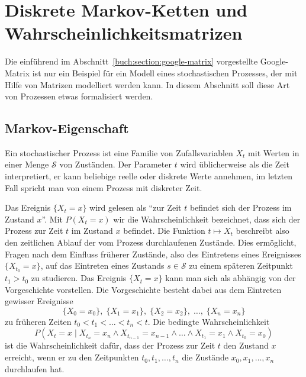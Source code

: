 %
%
%
\section{Diskrete Markov-Ketten und Wahrscheinlichkeitsmatrizen
\label{buch:section:diskrete-markov-ketten}}
Die einführend im Abschnitt~\ref{buch:section:google-matrix}
vorgestellte Google-Matrix ist nur ein Beispiel für ein
Modell eines stochastischen Prozesses, der mit Hilfe von Matrizen
modelliert werden kann.
In diesem Abschnitt soll diese Art von Prozessen etwas formalisiert
werden.

%
% 
\subsection{Markov-Eigenschaft}
Ein stochastischer Prozess ist eine Familie von Zufallsvariablen
%
%
%
$X_t$ mit Werten in einer Menge $\mathcal{S}$ von Zuständen.
Der Parameter $t$ wird üblicherweise als die Zeit interpretiert,
er kann beliebige reelle oder diskrete Werte annehmen, im letzten
Fall spricht man von einem Prozess mit diskreter Zeit.

Das Ereignis $\{X_t=x\}$ wird gelesen als ``zur Zeit $t$ befindet sich
der Prozess im Zustand $x$''.
Mit $P(X_t = x)$ wir die Wahrscheinlichkeit bezeichnet, dass sich
der Prozess zur Zeit $t$ im Zustand $x$ befindet.
Die Funktion $t\mapsto X_t$ beschreibt also den zeitlichen Ablauf
der vom Prozess durchlaufenen Zustände.
Dies ermöglicht, Fragen nach dem Einfluss früherer Zustände,
also des Eintretens eines Ereignisses $\{X_{t_0}=x\}$, auf das Eintreten eines
Zustands $s\in\mathcal{S}$ zu einem späteren Zeitpunkt $t_1>t_0$
zu studieren.
Das Ereignis $\{X_t = x\}$ kann man sich als abhängig von der Vorgeschichte
vorstellen.
%
Die Vorgeschichte besteht dabei aus dem Eintreten gewisser Ereignisse
\[
\{X_0=x_0\},\;
\{X_1=x_1\},\;
\{X_2=x_2\},\;
\dots,\;
\{X_n=x_n\}
\]
zu früheren Zeiten $t_0<t_1<\dots<t_n<t$.
Die bedingte Wahrscheinlichkeit
\begin{equation}
P(X_t = x \mid
X_{t_n}=x_n\wedge X_{t_{n-1}}=x_{n-1}\wedge\ldots\wedge X_{t_1}=x_1\wedge
X_{t_0}=x_0)
\label{buch:wahrscheinlichkeit:eqn:historybedingt}
\end{equation}
ist die Wahrscheinlichkeit dafür, dass der Prozess zur Zeit $t$ den
Zustand $x$ erreicht, wenn er zu den Zeitpunkten $t_0,t_1,\dots,t_n$
die Zustände $x_0,x_1,\dots,x_n$ durchlaufen hat.

